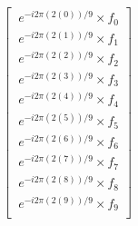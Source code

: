 \documentclass[preview]{standalone}
\begin{document}
\begin{align*}
\left[\begin{array}{l}\
            e^{-i 2 \pi(2(0)) / 9  } \times  f_{0}\\\
            e^{-i 2 \pi(2(1)) / 9  } \times  f_{1}\\\
            e^{-i 2 \pi(2(2)) / 9  } \times  f_{2}\\\
            e^{-i 2 \pi(2(3)) / 9  } \times  f_{3}\\\
            e^{-i 2 \pi(2(4)) / 9  } \times  f_{4}\\\
            e^{-i 2 \pi(2(5)) / 9  } \times  f_{5}\\\
            e^{-i 2 \pi(2(6)) / 9  } \times  f_{6}\\\
            e^{-i 2 \pi(2(7)) / 9  } \times  f_{7}\\\
            e^{-i 2 \pi(2(8)) / 9  } \times  f_{8}\\\
            e^{-i 2 \pi(2(9)) / 9  } \times  f_{9}\\\
            \end{array}\right]
\end{align*}
\end{document}
